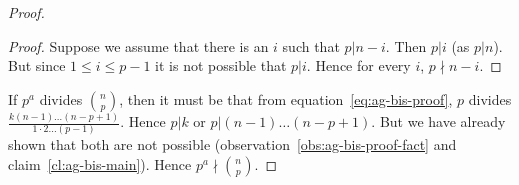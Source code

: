 \begin{proof}
\begin{proof}
		Suppose we assume that there is an $i$ such that $p | n-i$.
		Then $p|i$ (as $p|n$). But since $1 \le i \le p-1$ it is not
		possible that $p|i$. Hence for every $i$, $p \nmid n-i$.
	\end{proof}

	If $p^a$ divides $\binom{n}{p}$, then it must be that from
	equation~\ref{eq:ag-bis-proof}, $p$ divides $\frac{k(n-1) \ldots
	(n-p+1)}{1\cdot 2\ldots (p-1)}$. Hence $p | k$ or $p | (n-1)
	\ldots (n-p+1)$. But we have already shown that both are not possible
	(observation~\ref{obs:ag-bis-proof-fact} and
	claim~\ref{cl:ag-bis-main}). Hence $p^a \nmid \binom{n}{p}$.

\end{proof}

